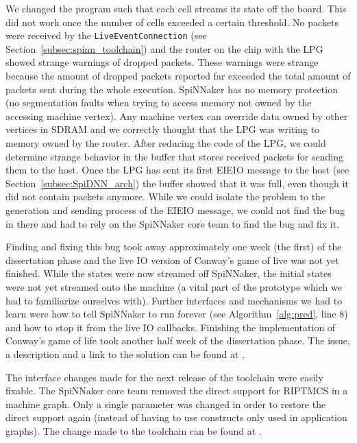 \documentclass[]{article}
\begin{document}
We changed the program such that each cell streams its state off the
board.
This did not work once the number of cells exceeded
a certain threshold.
No packets were received by the \texttt{LiveEventConnection}
(see Section~\ref{subsec:spinn_toolchain}) and the router on the
chip with the LPG showed strange warnings of dropped packets.
These warnings were strange because the amount of dropped packets
reported far exceeded the total amount of packets sent during the
whole execution.
SpiNNaker has no memory protection (no segmentation faults when
trying to access memory not owned by the accessing machine vertex).
Any machine vertex can override data owned by other vertices in SDRAM
and we correctly thought that the LPG was writing to memory owned by
the router.
After reducing the code of the LPG, we could determine strange
behavior in the buffer that stores received packets for sending them
to the host.
Once the LPG has sent its first EIEIO message to the host
(see Section~\ref{subsec:SpiDNN_arch}) the buffer showed that it was
full, even though it did not contain packets anymore.
While we could isolate the problem to the generation and sending
process of the EIEIO message, we could not find the bug in there
and had to rely on the SpiNNaker core team to find the bug and fix it.

Finding and fixing this bug took away approximately one week
(the first) of the dissertation phase and the live IO version of
Conway's game of live was not yet finished.
While the states were now streamed off SpiNNaker, the initial
states were not yet streamed onto the machine (a vital part of the
prototype which we had to familiarize ourselves with).
Further interfaces and mechanisms we had to learn were how to
tell SpiNNaker to run forever (see Algorithm~\ref{alg:pred}, line 8)
and how to stop it from the live IO callbacks.
Finishing the implementation of Conway's game of life took another
half week of the dissertation phase.
The issue, a description and a link to the solution can be found at
\citep{fassbender_2020a}.

The interface changes made for the next release of the toolchain
were easily fixable.
The SpiNNaker core team removed the direct support for RIPTMCS
in a machine graph.
Only a single parameter was changed in order to restore the direct
support again (instead of having to use constructs only used in
application graphs).
The change made to the toolchain can be found at
\citet{fassbender_2020b}.
\end{document}
